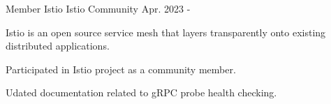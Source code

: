 \begin{cventries}
  \cventry
    {Member} %
    {Istio} %
    {Istio Community} %
    {Apr. 2023 - } %
    {
      \begin{cvitems} %
        \item {Istio is an open source service mesh that layers transparently onto existing distributed applications.}
        \item {Participated in Istio project as a community member.}
        \item {Udated documentation related to gRPC probe health checking.}
      \end{cvitems}
    }

\end{cventries}

